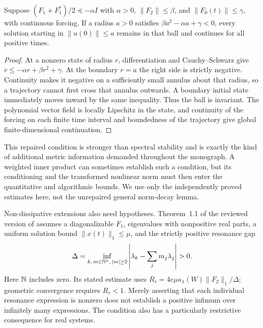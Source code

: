\begin{proposition}
\label{prop:fluid-dissipative-ball}
Suppose $(F_1+F_1^*)/2\preceq-\alpha I$ with $\alpha>0$, $\|F_2\|\le\beta$, and $\|F_0(t)\|\le\gamma$, with continuous forcing. If a radius $a>0$ satisfies $\beta a^2-\alpha a+\gamma<0$, every solution starting in $\|u(0)\|\le a$ remains in that ball and continues for all positive times.
\end{proposition}
\begin{proof}
At a nonzero state of radius $r$, differentiation and Cauchy--Schwarz give
$\dot r\le-\alpha r+\beta r^2+\gamma$. At the boundary $r=a$ the right side is strictly negative. Continuity makes it negative on a sufficiently small annulus about that radius, so a trajectory cannot first cross that annulus outwards. A boundary initial state immediately moves inward by the same inequality. Thus the ball is invariant. The polynomial vector field is locally Lipschitz in the state, and continuity of the forcing on each finite time interval and boundedness of the trajectory give global finite-dimensional continuation.
\end{proof}

This repaired condition is stronger than spectral stability and is exactly the kind of additional metric information demanded throughout the monograph. A weighted inner product can sometimes establish such a condition, but its conditioning and the transformed nonlinear norm must then enter the quantitative and algorithmic bounds. We use only the independently proved estimates here, not the unrepaired general norm-decay lemma.

Non-dissipative extensions also need hypotheses. Theorem~1.1 of the reviewed version of \citet{NSWu2025} assumes a diagonalizable $F_1$, eigenvalues with nonpositive real parts, a uniform solution bound $\|x(t)\|_1\le\mu$, and the strictly positive resonance gap
\[
 \Delta=\inf_{k,\,m\in\N^n,\,|m|\ge2}
       \left|\lambda_k-\sum_jm_j\lambda_j\right|>0.
\]
Here $\mathbb{N}$ includes zero. Its stated estimate uses
$R_r=4e\mu\kappa_1(W)\|F_2\|_1/\Delta$; geometric convergence requires $R_r<1$. Merely asserting that each individual resonance expression is nonzero does not establish a positive infimum over infinitely many expressions. The condition also has a particularly restrictive consequence for real systems.

